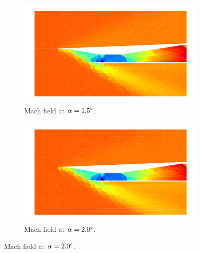 \begin{figure}[h]
    \begin{subfigure}[h]{0.48\linewidth}
        \centering
        \includegraphics[width=\linewidth]{rep/q5/mach_a15.pdf}
        \caption{Mach field at $\alpha=1.5\degree$.}
    \end{subfigure}
    \begin{subfigure}[h]{0.48\linewidth}
        \centering
        \includegraphics[width=\linewidth]{rep/q5/mach_a20.pdf}
        \caption{Mach field at $\alpha=2.0\degree$.}
    \end{subfigure}


\end{figure}
